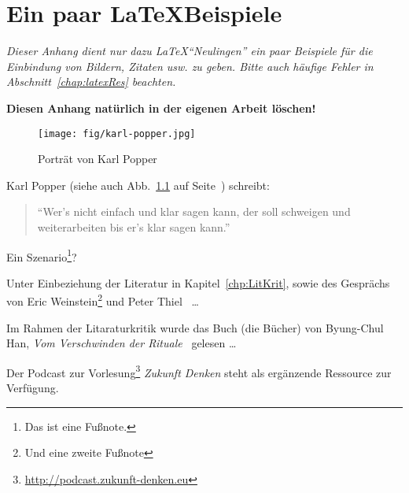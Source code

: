 \documentclass[twoside, a4paper, DIV=11, open=any, bibliography=totoc]{scrbook}
\begin{document}
\appendix
\chapter{Ein paar \LaTeX Beispiele} \label{chap:latex}

\textit{Dieser Anhang dient nur dazu \LaTeX "`Neulingen"' ein paar Beispiele für die Einbindung von Bildern, Zitaten usw. zu geben. Bitte auch häufige Fehler in Abschnitt~\ref{chap:latexRes} beachten.}

\begin{mdframed}
\textbf{Diesen Anhang natürlich in der eigenen Arbeit löschen!}
\end{mdframed}

\begin{figure}
    \centering
    \texttt{[image: fig/karl-popper.jpg]}
    \caption[Karl Popper]{Porträt von Karl Popper~\cite{PopperPortrait}}
    \label{fig:KarlPopper}
\end{figure}

Karl Popper (siehe auch Abb.~\ref{fig:KarlPopper} auf Seite~\pageref{fig:KarlPopper}) schreibt:

\begin{quote}
"`Wer's nicht einfach und klar sagen kann, der soll schweigen und weiterarbeiten bis er's klar sagen kann."'
\end{quote}

\blindtext

Ein Szenario\footnote{Das ist eine Fußnote.}?

\blindtext

Unter Einbeziehung der Literatur in Kapitel~\ref{chp:LitKrit}, sowie des Gesprächs von Eric Weinstein\footnote{Und eine zweite Fußnote} und Peter Thiel~\cite{WeinsteinThielPortal} \ldots

\blindtext

\blinddescription

\blindtext

\blinditemize

Im Rahmen der Litaraturkritik wurde das Buch (die Bücher) von Byung-Chul Han, \textit{Vom Verschwinden der Rituale}~\cite{HanRituale} gelesen \ldots

Der Podcast zur Vorlesung\footnote{\url{http://podcast.zukunft-denken.eu}} \textit{Zukunft Denken} steht als ergänzende Ressource zur Verfügung.
\end{document}

